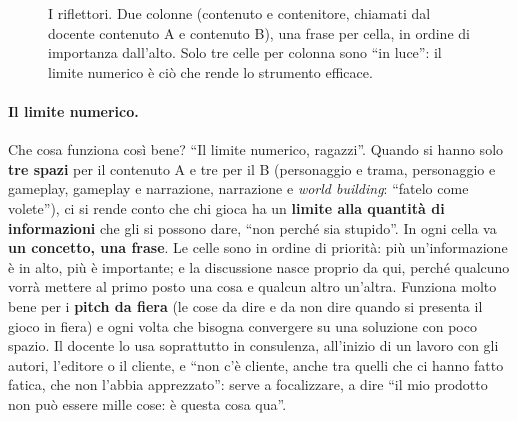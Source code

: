\begin{figure}[htbp]
\centering
{}
\caption{I riflettori. Due colonne (contenuto e contenitore, chiamati dal docente
contenuto A e contenuto B), una frase per cella, in ordine di importanza dall'alto. Solo tre
celle per colonna sono ``in luce'': il limite numerico è ciò che rende lo strumento
efficace.}
\label{a5:fig:riflettori}
\end{figure}

\paragraph{Il limite numerico.} Che cosa funziona così bene? ``Il limite numerico,
ragazzi''. Quando si hanno solo \textbf{tre spazi} per il contenuto A e tre per il B
(personaggio e trama, personaggio e gameplay, gameplay e narrazione, narrazione e
\emph{world building}: ``fatelo come volete''), ci si rende conto che chi gioca ha un
\textbf{limite alla quantità di informazioni} che gli si possono dare, ``non perché sia
stupido''. In ogni cella va \textbf{un concetto, una frase}. Le celle sono in ordine di
priorità: più un'informazione è in alto, più è importante; e la discussione nasce proprio
da qui, perché qualcuno vorrà mettere al primo posto una cosa e qualcun altro un'altra.
Funziona molto bene per i \textbf{pitch da fiera} (le cose da dire e da non dire quando si
presenta il gioco in fiera) e ogni volta che bisogna convergere su una soluzione con poco
spazio. Il docente lo usa soprattutto in consulenza, all'inizio di un lavoro con gli
autori, l'editore o il cliente, e ``non c'è cliente, anche tra quelli che ci hanno fatto
fatica, che non l'abbia apprezzato'': serve a focalizzare, a dire ``il mio prodotto non può
essere mille cose: è questa cosa qua''.

